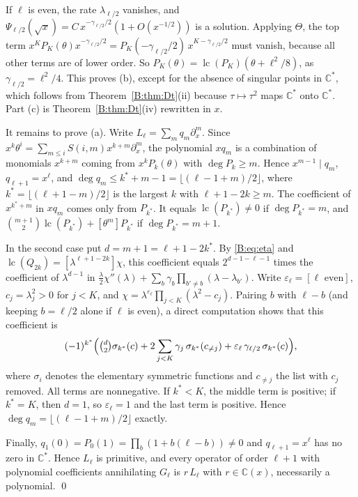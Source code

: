 \documentclass[11pt,a4paper]{article}
\theoremstyle{definition}
\theoremstyle{remark}
\newcommand{\C}{\mathbb C}
\newcommand{\fl}[1]{\lfloor #1\rfloor}
\DeclareMathOperator{\lc}{lc}
\numberwithin{equation}{section}
\begin{document}
If $\ell$ is even, the rate $\lambda_{\ell/2}$ vanishes, and $\Psi_{\ell/2}(\sqrt x)=C\,x^{-\gamma_{\ell/2}/2}(1+O(x^{-1/2}))$ is a solution. Applying $\Theta$, the top term $x^KP_K(\theta)x^{-\gamma_{\ell/2}/2}=P_K(-\gamma_{\ell/2}/2)\,x^{K-\gamma_{\ell/2}/2}$ must vanish, because all other terms are of lower order. So $P_K(\theta)=\lc(P_K)(\theta+\ell^2/8)$, as $\gamma_{\ell/2}=\ell^2/4$. This proves (b), except for the absence of singular points in $\C^*$, which follows from Theorem~\ref{B:thm:Dt}(ii) because $\tau\mapsto\tau^2$ maps $\C^*$ onto $\C^*$. Part (c) is Theorem~\ref{B:thm:Dt}(iv) rewritten in $x$.

It remains to prove (a). Write $L_\ell=\sum_mq_m\partial_x^m$. Since $x^k\theta^i=\sum_{m\le i}S(i,m)x^{k+m}\partial_x^m$, the polynomial $xq_m$ is a combination of monomials $x^{k+m}$ coming from $x^kP_k(\theta)$ with $\deg P_k\ge m$. Hence $x^{m-1}\mid q_m$, $q_{\ell+1}=x^\ell$, and $\deg q_m\le k^*+m-1=\fl{(\ell-1+m)/2}$, where $k^*=\fl{(\ell+1-m)/2}$ is the largest $k$ with $\ell+1-2k\ge m$. The coefficient of $x^{k^*+m}$ in $xq_m$ comes only from $P_{k^*}$. It equals $\lc(P_{k^*})\ne0$ if $\deg P_{k^*}=m$, and $\binom{m+1}{2}\lc(P_{k^*})+[\theta^m]P_{k^*}$ if $\deg P_{k^*}=m+1$.

In the second case put $d=m+1=\ell+1-2k^*$. By \eqref{B:eq:eta} and $\lc(Q_{2k})=[\lambda^{\ell+1-2k}]\chi$, this coefficient equals $2^{d-1-\ell-1}$ times the coefficient of $\lambda^{d-1}$ in $\frac\lambda2\chi''(\lambda)+\sum_b\gamma_b\prod_{b'\ne b}(\lambda-\lambda_{b'})$. Write $\varepsilon_\ell=[\ell\text{ even}]$, $c_j=\lambda_j^2>0$ for $j<K$, and $\chi=\lambda^{\varepsilon_\ell}\prod_{j<K}(\lambda^2-c_j)$. Pairing $b$ with $\ell-b$ (and keeping $b=\ell/2$ alone if $\ell$ is even), a direct computation shows that this coefficient is
\[
(-1)^{k^*}\Bigl(\tbinom{d}{2}\sigma_{k^*}(c)+2\sum_{j<K}\gamma_j\,\sigma_{k^*}(c_{\ne j})+\varepsilon_\ell\,\gamma_{\ell/2}\,\sigma_{k^*}(c)\Bigr),
\]
where $\sigma_i$ denotes the elementary symmetric functions and $c_{\ne j}$ the list with $c_j$ removed. All terms are nonnegative. If $k^*<K$, the middle term is positive; if $k^*=K$, then $d=1$, so $\varepsilon_\ell=1$ and the last term is positive. Hence $\deg q_m=\fl{(\ell-1+m)/2}$ exactly.

Finally, $q_1(0)=P_0(1)=\prod_b(1+b(\ell-b))\ne0$ and $q_{\ell+1}=x^\ell$ has no zero in $\C^*$. Hence $L_\ell$ is primitive, and every operator of order $\ell+1$ with polynomial coefficients annihilating $G_\ell$ is $r\,L_\ell$ with $r\in\C(x)$, necessarily a polynomial. \qed
\end{document}
